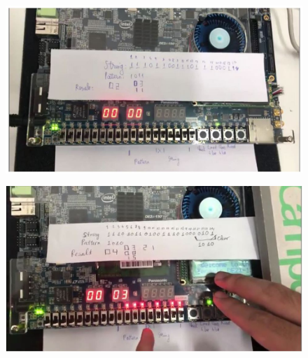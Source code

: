 \documentclass[a4paper]{article}
\begin{document}
	\begin{center}
	\begin{figure}[H]
		\begin{center}
			\includegraphics[scale=.5] {k8.jpg}
		\end{center}
	\end{figure}
	\end{center}  
	
	\begin{center}
	\begin{figure}[H]
		\begin{center}
			\includegraphics[scale=.5] {k4.jpg}
		\end{center}
	\end{figure}
	\end{center}  
	
\end{document}
